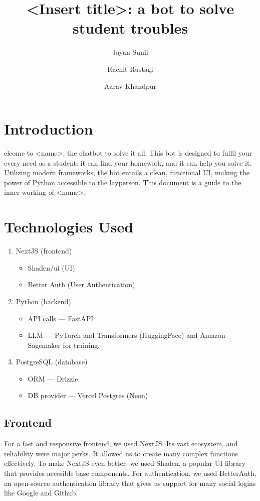 \documentclass[9pt,a4paper,twocolumn,twoside]{tau-class/tau}
\title{<Insert title>: a bot to solve student troubles}
\author[a,1]{Jayan Sunil}
\author[b,2]{Rachit Rustagi}
\author[c,3]{Aarav Khandpur}
\affil[a]{IX --- Everest, +91 9910856655}
\affil[b]{IX --- Nilgiris, idk}
\affil[c]{IX --- Nilgiris, idk}
\begin{document}
\maketitle
\thispagestyle{firststyle}
\tauabstract
\tableofcontents
\linenumbers


\section{Introduction}

elcome to <name>, the chatbot to solve it all. This bot is designed to fulfil your every need as a student: it can find your homework, and it can help you solve it. Utilizing modern frameworks, the bot entails a clean, functional UI, making the power of Python accessible to the layperson. This document is a guide to the inner working of <name>.


\section{Technologies Used}
\begin{enumerate}
	\item NextJS (frontend)
	      \begin{itemize}
		      \item Shadcn/ui (UI)
		      \item Better Auth (User Authentication)
	      \end{itemize}
	\item Python (backend)
	      \begin{itemize}
		      \item API calls --- FastAPI
		      \item LLM --- PyTorch and Transformers (HuggingFace) and Amazon Sagemaker for training.
	      \end{itemize}
	\item PostgreSQL (database)
	      \begin{itemize}
		      \item ORM --- Drizzle
		      \item DB provider --- Vercel Postgres (Neon)
	      \end{itemize}
\end{enumerate}
\subsection{Frontend}
For a fast and responsive frontend, we used NextJS. Its vast ecosystem, and reliability were major perks. It allowed us to create many complex functions effectively. To make NextJS even better, we used Shadcn, a popular UI library that provides accesible base components. For authentication, we used BetterAuth, an open-source authentication library that gives us support for many social logins like Google and Github.
\end{document}
